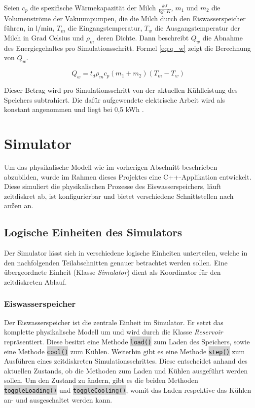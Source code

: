 Seien $ c_p $ die spezifische Wärmekapazität der Milch $ \frac{kJ}{kg \cdot K} $, $ m_1 $ und $ m_2 $ die Volumenströme der Vakuumpumpen, die die Milch durch den Eiswasserspeicher führen, in l/min, $ T_m $ die Eingangstemperatur, $ T_w $ die Ausgangstemperatur der Milch in Grad Celsius und $ \rho_m $ deren Dichte. Dann beschreibt $ Q_w $ die Abnahme des Energiegehaltes pro Simulationsschritt. Formel \ref{eq:q_w} zeigt die Berechnung von $ Q_w $.

\begin{equation}\label{eq:q_w}
Q_w = t_d \rho_m c_p (m_1 + m_2) (T_m - T_w)
\end{equation}

Dieser Betrag wird pro Simulationsschritt von der aktuellen Kühlleistung des Speichers subtrahiert. Die dafür aufgewendete elektrische Arbeit wird als konstant angenommen und liegt bei 0,5 kWh \cite{kusow}.

\section{Simulator}
\label{software_simulator}

Um das physikalische Modell wie im vorherigen Abschnitt beschrieben abzubilden, wurde im Rahmen dieses Projektes eine C++-Applikation entwickelt. Diese simuliert die physikalischen Prozesse des Eiswasserspeichers, läuft zeitdiskret ab, ist konfigurierbar und bietet verschiedene Schnittstellen nach außen an. 

\subsection{Logische Einheiten des Simulators}
Der Simulator lässt sich in verschiedene logische Einheiten unterteilen, welche in den nachfolgenden Teilabschnitten genauer betrachtet werden sollen. Eine übergeordnete Einheit (Klasse \emph{Simulator}) dient als Koordinator für den zeitdiskreten Ablauf.

\subsubsection{Eiswasserspeicher}
Der Eiswasserspeicher ist die zentrale Einheit im Simulator. Er setzt das komplette physikalische Modell um und wird durch die Klasse \emph{Reservoir} repräsentiert. Diese besitzt eine Methode \colorbox{lightgrey}{\lstinline[basicstyle=\ttfamily]|load()|} zum Laden des Speichers, sowie eine Methode \colorbox{lightgrey}{\lstinline[basicstyle=\ttfamily]|cool()|} zum Kühlen. Weiterhin gibt es eine Methode \colorbox{lightgrey}{\lstinline[basicstyle=\ttfamily]|step()|} zum Ausführen eines zeitdiskreten Simulationsschrittes. Diese entscheidet anhand des aktuellen Zustands, ob die Methoden zum Laden und Kühlen ausgeführt werden sollen. Um den Zustand zu ändern, gibt es die beiden Methoden \colorbox{lightgrey}{\lstinline[basicstyle=\ttfamily]|toggleLoading()|} und \colorbox{lightgrey}{\lstinline[basicstyle=\ttfamily]|toggleCooling()|}, womit das Laden respektive das Kühlen an- und ausgeschaltet werden kann.

